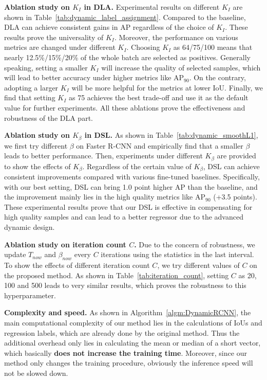 \documentclass[runningheads]{llncs}
\begin{document}
\textbf{Ablation study on $K_I$ in DLA.}
Experimental results on different $K_I$ are shown in Table~\ref{tab:dynamic_label_assignment}. Compared to the baseline, DLA can achieve consistent gains in AP regardless of the choice of $K_I$. These results prove the universality of $K_I$. Moreover, the performance on various metrics are changed under different $K_I$. Choosing $K_I$ as 64/75/100 means that nearly 12.5\%/15\%/20\% of the whole batch are selected as positives. Generally speaking, setting a smaller $K_I$ will increase the quality of selected samples, which will lead to better accuracy under higher metrics like $\mathrm{AP_{90}}$. On the contrary, adopting a larger $K_I$ will be more helpful for the metrics at lower IoU. Finally, we find that setting $K_I$ as 75 achieves the best trade-off and use it as the default value for further experiments. All these ablations prove the effectiveness and robustness of the DLA part.


\noindent
\textbf{Ablation study on $K_\beta$ in DSL.}
As shown in Table~\ref{tab:dynamic_smoothL1}, we first try different $\beta$ on Faster R-CNN and empirically find that a smaller $\beta$ leads to better performance. Then, experiments under different $K_\beta$ are provided to show the effects of $K_\beta$. Regardless of the certain value of $K_\beta$, DSL can achieve consistent improvements compared with various fine-tuned baselines. Specifically, with our best setting, DSL can bring 1.0 point higher AP than the baseline, and the improvement mainly lies in the high quality metrics like $\mathrm{AP_{90}}$ (+3.5 points). These experimental results prove that our DSL is effective in compensating for high quality samples and can lead to a better regressor due to the advanced dynamic design.

\noindent
\textbf{Ablation study on iteration count $C$.}
Due to the concern of robustness, we update $T_{now}$ and $\beta_{now}$ every $C$ iterations using the statistics in the last interval. To show the effects of different iteration count $C$, we try different values of $C$ on the proposed method. As shown in Table~\ref{tab:iteration_count}, setting $C$ as 20, 100 and 500 leads to very similar results, which proves the robustness to this hyperparameter.

\noindent
\textbf{Complexity and speed.}
As shown in Algorithm~\ref{algm:DynamicRCNN}, the main computational complexity of our method lies in the calculations of IoUs and regression labels, which are already done by the original method. Thus the additional overhead only lies in calculating the mean or median of a short vector, which basically \textbf{does not increase the training time}. Moreover, since our method only changes the training procedure, obviously the inference speed will not be slowed down.
\end{document}
